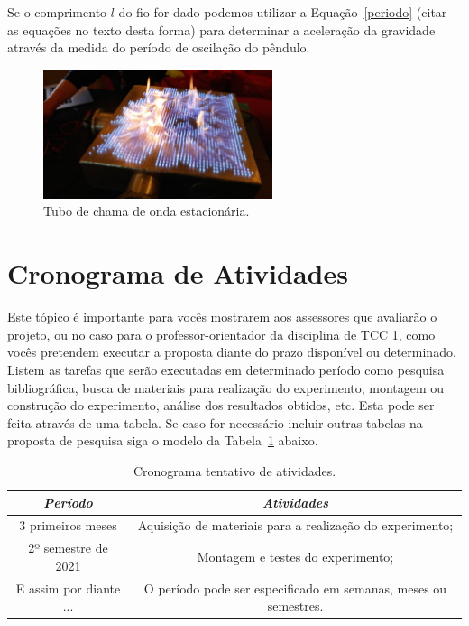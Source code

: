 \documentclass[12pt,oneside,brazil,hidelinks,article,sumario=tradicional,a4paper]{abntex2}
\begin{document}
Se o comprimento $l$ do fio for dado podemos utilizar a Equação~\eqref{periodo} ({\color{red}citar as equações no texto desta forma}) para determinar a aceleração da gravidade através da medida do período de oscilação do pêndulo.

\begin{figure}[ht!]
  \centering
  \caption{Tubo de chama de onda estacionária.}\label{fig3}
  \vspace{1mm}
  \includegraphics[width=0.6\textwidth]{Chamas.jpg}
\end{figure}

\section{Cronograma de Atividades}

Este tópico é importante para vocês mostrarem aos assessores que avaliarão o projeto, ou no caso para o professor-orientador da disciplina de TCC 1, como vocês pretendem executar a proposta diante do prazo disponível ou determinado. Listem as tarefas que serão executadas em determinado período como pesquisa bibliográfica, busca de materiais para realização do experimento, montagem ou construção do experimento, análise dos resultados obtidos, etc. Esta pode ser feita através de uma tabela. Se caso for necessário incluir outras tabelas na proposta de pesquisa siga o modelo da Tabela~\ref{tabela1} abaixo.

\begin{table}[ht!]
  \centering
  \caption{Cronograma tentativo de atividades.}\label{tabela1}
  \begin{tabular}{cc}
    \toprule
    \textbf{\emph{Período}} & \textbf{\emph{Atividades}}\\
    \midrule
    3 primeiros meses      & Aquisição de materiais para a realização do experimento;        \\
    2º semestre de 2021    & Montagem e testes do experimento;                               \\
    E assim por diante ... & O período pode ser especificado em semanas, meses ou semestres. \\
    \bottomrule
  \end{tabular}
\end{table}
\end{document}
